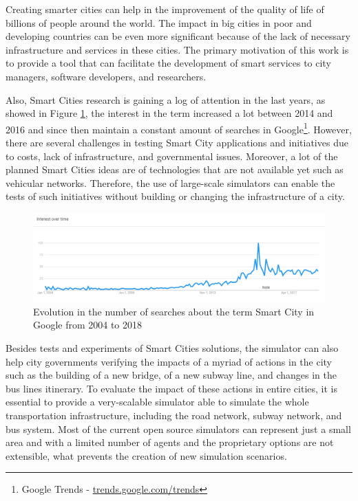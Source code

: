 Creating smarter cities can help in the improvement of the quality of life of billions of people around the world. The impact in big cities in poor and developing countries can be even more significant because of the lack of necessary infrastructure and services in these cities. The primary motivation of this work is to provide a tool that can facilitate the development of smart services to city managers, software developers, and researchers.  

Also, Smart Cities research is gaining a log of attention in the last years, as showed in Figure \ref{fig:trends}, the interest in the term increased a lot between 2014 and 2016 and since then maintain a constant amount of searches in Google\footnote{Google Trends - \url{trends.google.com/trends}}. However, there are several challenges in testing Smart City applications and initiatives due to costs, lack of infrastructure, and governmental issues. Moreover, a lot of the planned Smart Cities ideas are of technologies that are not available yet such as vehicular networks. Therefore, the use of large-scale simulators can enable the tests of such initiatives without building or changing the infrastructure of a city.

\begin{figure}[!htb]
\centering
\includegraphics[width=1\textwidth]{figuras/chap-introduction/trends.png}
\caption{Evolution in the number of searches about the term Smart City in Google from 2004 to 2018}
\label{fig:trends}
\end{figure}

Besides tests and experiments of Smart Cities solutions, the simulator can also help city governments verifying the impacts of a myriad of actions in the city such as the building of a new bridge, of a new subway line, and changes in the bus lines itinerary. To evaluate the impact of these actions in entire cities, it is essential to provide a very-scalable simulator able to simulate the whole transportation infrastructure, including the road network, subway network, and bus system. Most of the current open source simulators can represent just a small area and with a limited number of agents and the proprietary options are not extensible, what prevents the creation of new simulation scenarios.

